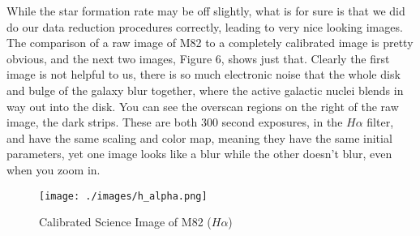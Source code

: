 \documentclass[modern]{aastex63}
\begin{document}
While the star formation rate may be off slightly, what is for sure is that we did do our data reduction procedures correctly, leading to very nice looking images. The comparison of a raw image of M82 to a completely calibrated image is pretty obvious, and the next two images, Figure 6, shows just that. Clearly the first image is not helpful to us, there is so much electronic noise that the whole disk and bulge of the galaxy blur together, where the active galactic nuclei blends in way out into the disk. You can see the overscan regions on the right of the raw image, the dark strips. These are both 300 second exposures, in the $H\alpha$ filter, and have the same scaling and color map, meaning they have the same initial parameters, yet one image looks like a blur while the other doesn't blur, even when you zoom in.

\begin{figure}
\centering
\texttt{[image: ./images/h\_alpha.png]}
\caption{\label{fig:frog}Calibrated Science Image of M82 ($H\alpha$)}
\end{figure}


\end{document}
